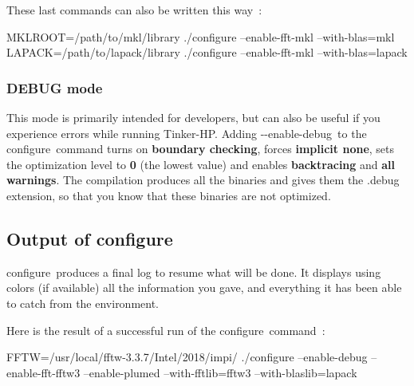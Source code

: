 These last commands can also be written this way \-: \begin{DoxyVerb}    MKLROOT=/path/to/mkl/library    ./configure --enable-fft-mkl --with-blas=mkl
    LAPACK=/path/to/lapack/library  ./configure --enable-fft-mkl --with-blas=lapack
\end{DoxyVerb}


\subsubsection*{D\-E\-B\-U\-G mode}

This mode is primarily intended for developers, but can also be useful if you experience errors while running Tinker-\/\-H\-P. Adding {\ttfamily -\/-\/enable-\/debug} to the {\ttfamily configure} command turns on {\bfseries boundary checking}, forces {\bfseries implicit none}, sets the optimization level to {\bfseries 0} (the lowest value) and enables {\bfseries backtracing} and {\bfseries all warnings}. The compilation produces all the binaries and gives them the {\ttfamily .debug} extension, so that you know that these binaries are not optimized.

\subsection*{Output of configure}

{\ttfamily configure} produces a final log to resume what will be done. It displays using colors (if available) all the information you gave, and everything it has been able to catch from the environment.

Here is the result of a successful run of the {\ttfamily configure} command \-: \begin{DoxyVerb}FFTW=/usr/local/fftw-3.3.7/Intel/2018/impi/
./configure --enable-debug --enable-fft-fftw3 --enable-plumed --with-fftlib=fftw3
--with-blaslib=lapack
\end{DoxyVerb}


